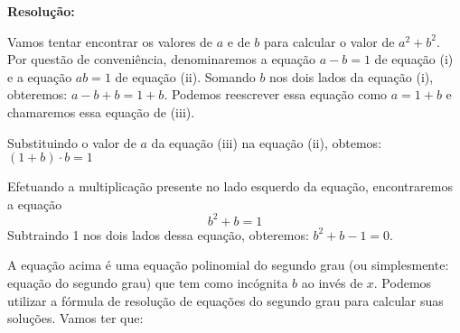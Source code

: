 \documentclass[a4paper, 12pt]{article}
\begin{document}
    
    



\noindent \textbf{Resolução:}  

\noindent Vamos tentar encontrar os valores de   \(a\) e de \(b\) para calcular o valor de \(a^2 + b^2\). Por questão de conveniência, denominaremos a equação \(a - b = 1\) de equação (i) e a equação \(ab = 1\) de equação (ii). %
Somando \(b\) nos dois lados da equação (i), obteremos:   \(a - b + b = 1 + b\). Podemos reescrever essa equação como  \(a = 1 + b\) e %
chamaremos essa equação de (iii).   

\noindent %
Substituindo o valor de  \(a\) da equação (iii) na equação (ii), obtemos: \((1 + b)\cdot{b} = 1\)  


\noindent Efetuando a multiplicação presente no lado esquerdo da equação, encontraremos a equação %
\[b^2 + b = 1\] 
\noindent Subtraindo 1 nos dois lados dessa equação, obteremos: %
  \(b^2 + b - 1 = 0\). 

\noindent A equação acima é uma equação polinomial do segundo grau (ou simplesmente: equação do segundo grau) que tem como incógnita   \(b\) ao invés de \(x\). Podemos utilizar a fórmula de resolução de equações do segundo grau para calcular suas soluções. Vamos ter que:  
\end{document}
